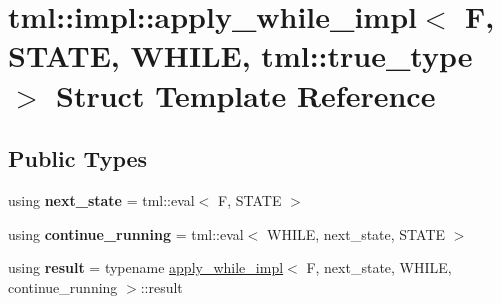\hypertarget{structtml_1_1impl_1_1apply__while__impl_3_01_f_00_01_s_t_a_t_e_00_01_w_h_i_l_e_00_01tml_1_1true__type_01_4}{\section{tml\+:\+:impl\+:\+:apply\+\_\+while\+\_\+impl$<$ F, S\+T\+A\+T\+E, W\+H\+I\+L\+E, tml\+:\+:true\+\_\+type $>$ Struct Template Reference}
\label{structtml_1_1impl_1_1apply__while__impl_3_01_f_00_01_s_t_a_t_e_00_01_w_h_i_l_e_00_01tml_1_1true__type_01_4}
}
\subsection*{Public Types}
\begin{DoxyCompactItemize}
\item 
\hypertarget{structtml_1_1impl_1_1apply__while__impl_3_01_f_00_01_s_t_a_t_e_00_01_w_h_i_l_e_00_01tml_1_1true__type_01_4_a581c4e6e55962372f5babc17e337b174}{using {\bfseries next\+\_\+state} = tml\+::eval$<$ F, S\+T\+A\+T\+E $>$}\label{structtml_1_1impl_1_1apply__while__impl_3_01_f_00_01_s_t_a_t_e_00_01_w_h_i_l_e_00_01tml_1_1true__type_01_4_a581c4e6e55962372f5babc17e337b174}

\item 
\hypertarget{structtml_1_1impl_1_1apply__while__impl_3_01_f_00_01_s_t_a_t_e_00_01_w_h_i_l_e_00_01tml_1_1true__type_01_4_acfc1b3fde20059425a07595155496ed2}{using {\bfseries continue\+\_\+running} = tml\+::eval$<$ W\+H\+I\+L\+E, next\+\_\+state, S\+T\+A\+T\+E $>$}\label{structtml_1_1impl_1_1apply__while__impl_3_01_f_00_01_s_t_a_t_e_00_01_w_h_i_l_e_00_01tml_1_1true__type_01_4_acfc1b3fde20059425a07595155496ed2}

\item 
\hypertarget{structtml_1_1impl_1_1apply__while__impl_3_01_f_00_01_s_t_a_t_e_00_01_w_h_i_l_e_00_01tml_1_1true__type_01_4_a08bbcb9ef90fa7444378deb233140e1f}{using {\bfseries result} = typename \hyperlink{structtml_1_1impl_1_1apply__while__impl}{apply\+\_\+while\+\_\+impl}$<$ F, next\+\_\+state, W\+H\+I\+L\+E, continue\+\_\+running $>$\+::result}\label{structtml_1_1impl_1_1apply__while__impl_3_01_f_00_01_s_t_a_t_e_00_01_w_h_i_l_e_00_01tml_1_1true__type_01_4_a08bbcb9ef90fa7444378deb233140e1f}

\end{DoxyCompactItemize}
